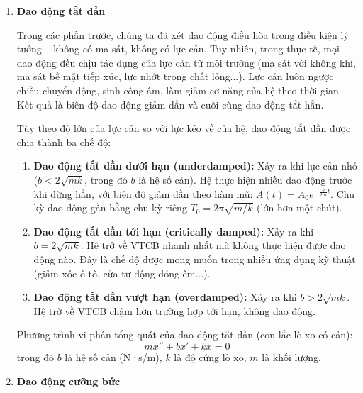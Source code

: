 \begin{enumerate}[label=\alph*)]
    \item \textbf{Dao động tắt dần}

    Trong các phần trước, chúng ta đã xét dao động điều hòa trong điều kiện lý tưởng – không có ma sát, không có lực cản. Tuy nhiên, trong thực tế, mọi dao động đều chịu tác dụng của lực cản từ môi trường (ma sát với không khí, ma sát bề mặt tiếp xúc, lực nhớt trong chất lỏng...). Lực cản luôn ngược chiều chuyển động, sinh công âm, làm giảm cơ năng của hệ theo thời gian. Kết quả là biên độ dao động giảm dần và cuối cùng dao động tắt hẳn.

    \begin{center}
    \end{center}

    Tùy theo độ lớn của lực cản so với lực kéo về của hệ, dao động tắt dần được chia thành ba chế độ:

    \begin{enumerate}
        \item \textbf{Dao động tắt dần dưới hạn (underdamped):} Xảy ra khi lực cản nhỏ ($b < 2\sqrt{mk}$, trong đó $b$ là hệ số cản). Hệ thực hiện nhiều dao động trước khi dừng hẳn, với biên độ giảm dần theo hàm mũ: $A(t) = A_0 e^{-\frac{b}{2m}t}$. Chu kỳ dao động gần bằng chu kỳ riêng $T_0 = 2\pi\sqrt{m/k}$ (lớn hơn một chút).
        
        \item \textbf{Dao động tắt dần tới hạn (critically damped):} Xảy ra khi $b = 2\sqrt{mk}$. Hệ trở về VTCB nhanh nhất mà không thực hiện được dao động nào. Đây là chế độ được mong muốn trong nhiều ứng dụng kỹ thuật (giảm xóc ô tô, cửa tự động đóng êm...).
        
        \item \textbf{Dao động tắt dần vượt hạn (overdamped):} Xảy ra khi $b > 2\sqrt{mk}$. Hệ trở về VTCB chậm hơn trường hợp tới hạn, không dao động.
    \end{enumerate}

    Phương trình vi phân tổng quát của dao động tắt dần (con lắc lò xo có cản):
    \[
        mx'' + bx' + kx = 0
    \]
    trong đó $b$ là hệ số cản (N·s/m), $k$ là độ cứng lò xo, $m$ là khối lượng.

    \item \textbf{Dao động cưỡng bức}


\end{enumerate}
